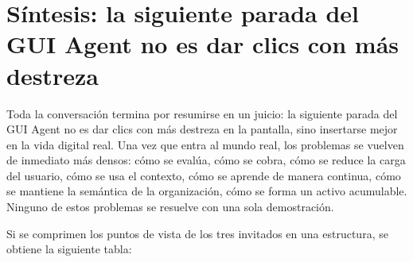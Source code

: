 \section{Síntesis: la siguiente parada del GUI Agent no es dar clics con más destreza}

Toda la conversación termina por resumirse en un juicio: la siguiente parada del GUI Agent no es dar clics con más destreza en la pantalla, sino insertarse mejor en la vida digital real. Una vez que entra al mundo real, los problemas se vuelven de inmediato más densos: cómo se evalúa, cómo se cobra, cómo se reduce la carga del usuario, cómo se usa el contexto, cómo se aprende de manera continua, cómo se mantiene la semántica de la organización, cómo se forma un activo acumulable. Ninguno de estos problemas se resuelve con una sola demostración.

Si se comprimen los puntos de vista de los tres invitados en una estructura, se obtiene la siguiente tabla:

